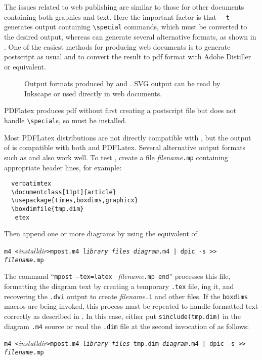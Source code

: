 
The issues related to web publishing are similar to those for other
documents containing both graphics and text.
Here the important factor is that \gpic\ {\tt -t} generates output
containing \tpic \verb|\special| commands, which must be converted
to the desired output, whereas \dpic can generate several alternative
formats, as shown in .
One of the easiest methods
for producing web documents is to generate postscript as usual and to
convert the result to pdf format with Adobe Distiller or equivalent.
\begin{figure}[H]
   
   \caption{Output formats produced by  and \dpic.
      SVG output can be read by Inkscape or used directly in web documents.}
   \label{Workflow}
   \end{figure}

PDFlatex produces pdf without first creating a postscript file
but does not handle \tpic \verb|\special|s, so \dpic must be
installed.

Most PDFLatex distributions are not directly compatible with \PSTricks, but
the \TPGF output of \dpic is compatible with both \latex and PDFLatex.
Several alternative \dpic output formats such as
\mfpic and \MetaPost also work well.
To test \MetaPost, create a file {\sl filename}{\tt .mp}
containing appropriate header lines, for example:
\begin{verbatim}
  verbatimtex
  \documentclass[11pt]{article}
  \usepackage{times,boxdims,graphicx}
  \boxdimfile{tmp.dim}
   etex
\end{verbatim}
Then append one or more diagrams by using the equivalent of

{\tt m4 <}{\sl installdir}{\tt >mpost.m4 {\sl library files}
  {\sl diagram}.m4 | dpic -s >> {\sl filename}.mp}

The command ``{\tt mpost --tex=latex } {\sl filename}{\tt .mp end}''
processes this file, formatting the diagram text by creating a
temporary {\tt .tex} file, \latex{}ing it, and recovering the {\tt .dvi}
output to create {\sl filename}{\tt .1} and other files.  If the {\tt boxdims}
macros are being invoked, this process must be repeated to handle
formatted text correctly as described in .
In this case, either put {\tt sinclude(tmp.dim)} in the diagram {\tt .m4}
source or read the {\tt .dim} file at the second invocation of
\Mfour as follows:

{\tt m4 <}{\sl installdir}{\tt >mpost.m4 {\sl library files} tmp.dim
  {\sl diagram}.m4 | dpic -s >> {\sl filename}.mp}

